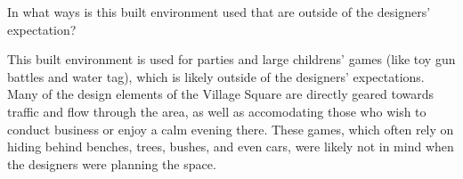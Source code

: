 \begin{homeworkProblem}

	In what ways is this built environment used that are outside of the designers' expectation?

	\solution

	This built environment is used for parties and large childrens' games (like toy gun battles and water tag), which is likely outside of the designers' expectations. Many of the design elements of the Village Square are directly geared towards traffic and flow through the area, as well as accomodating those who wish to conduct business or enjoy a calm evening there. These games, which often rely on hiding behind benches, trees, bushes, and even cars, were likely not in mind when the designers were planning the space.

\end{homeworkProblem}

